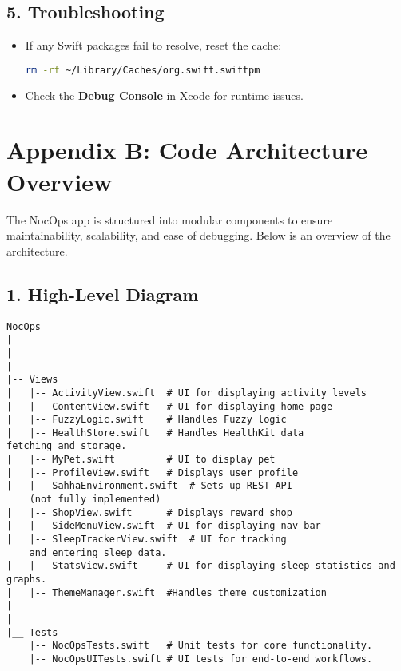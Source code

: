 \documentclass[10pt,twocolumn]{article}
\begin{document}
\subsection*{5. Troubleshooting}
\begin{itemize}
    \item If any Swift packages fail to resolve, reset the cache:
    \begin{lstlisting}[language=bash]
rm -rf ~/Library/Caches/org.swift.swiftpm
    \end{lstlisting}
    \item Check the \textbf{Debug Console} in Xcode for runtime issues.
\end{itemize}

\section*{Appendix B: Code Architecture Overview}

The NocOps app is structured into modular components to ensure maintainability, scalability, and ease of debugging. Below is an overview of the architecture.

\subsection*{1. High-Level Diagram}
\begin{verbatim}
NocOps
|
|
|
|-- Views
|   |-- ActivityView.swift  # UI for displaying activity levels
|   |-- ContentView.swift   # UI for displaying home page
|   |-- FuzzyLogic.swift    # Handles Fuzzy logic
|   |-- HealthStore.swift   # Handles HealthKit data    
fetching and storage.
|   |-- MyPet.swift         # UI to display pet 
|   |-- ProfileView.swift   # Displays user profile
|   |-- SahhaEnvironment.swift  # Sets up REST API 
    (not fully implemented) 
|   |-- ShopView.swift      # Displays reward shop
|   |-- SideMenuView.swift  # UI for displaying nav bar
|   |-- SleepTrackerView.swift  # UI for tracking 
    and entering sleep data.
|   |-- StatsView.swift     # UI for displaying sleep statistics and graphs.
|   |-- ThemeManager.swift  #Handles theme customization
|
|
|__ Tests
    |-- NocOpsTests.swift   # Unit tests for core functionality.
    |-- NocOpsUITests.swift # UI tests for end-to-end workflows.
\end{verbatim}
\end{document}
